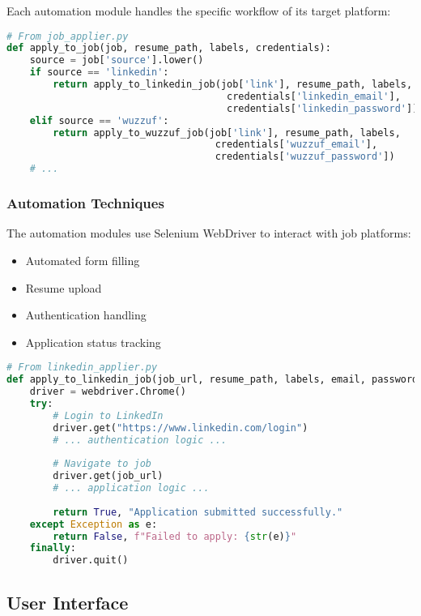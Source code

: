 \documentclass[12pt,a4paper]{article}
\begin{document}
Each automation module handles the specific workflow of its target platform:

\begin{lstlisting}[language=Python, caption=Job Application Automation]
# From job_applier.py
def apply_to_job(job, resume_path, labels, credentials):
    source = job['source'].lower()
    if source == 'linkedin':
        return apply_to_linkedin_job(job['link'], resume_path, labels, 
                                      credentials['linkedin_email'], 
                                      credentials['linkedin_password'])
    elif source == 'wuzzuf':
        return apply_to_wuzzuf_job(job['link'], resume_path, labels, 
                                    credentials['wuzzuf_email'], 
                                    credentials['wuzzuf_password'])
    # ...
\end{lstlisting}

\subsubsection{Automation Techniques}
The automation modules use Selenium WebDriver to interact with job platforms:
\begin{itemize}
    \item Automated form filling
    \item Resume upload
    \item Authentication handling
    \item Application status tracking
\end{itemize}

\begin{lstlisting}[language=Python, caption=LinkedIn Application Automation (Excerpt)]
# From linkedin_applier.py
def apply_to_linkedin_job(job_url, resume_path, labels, email, password):
    driver = webdriver.Chrome()
    try:
        # Login to LinkedIn
        driver.get("https://www.linkedin.com/login")
        # ... authentication logic ...
        
        # Navigate to job
        driver.get(job_url)
        # ... application logic ...
        
        return True, "Application submitted successfully."
    except Exception as e:
        return False, f"Failed to apply: {str(e)}"
    finally:
        driver.quit()
\end{lstlisting}

\subsection{User Interface}
\end{document}
